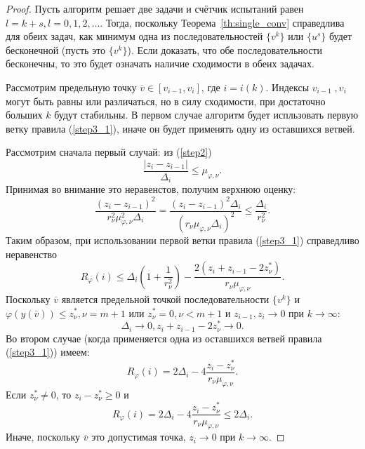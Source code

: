 \begin{proof}
  Пусть алгоритм решает две задачи и счётчик испытаний равен \(l = k + s, l=0,1,2,\dots\).
  Тогда, поскольку Теорема~\ref{th:single_conv} справедлива для обеих задач, как минимум одна из последовательностей
  \(\{v^k\}\) или \(\{u^s\}\) будет бесконечной (пусть это \(\{v^k\}\)).
  Если доказать, что обе последовательности бесконечны, то это будет означать наличие сходимости в обеих задачах.

  Рассмотрим предельную точку \(\overline{v}\in [v_{i-1},v_i]\), где \(i=i(k)\). Индексы \(v_{i-1}\;,v_i\)
  могут быть равны или различаться, но в силу сходимости, при достаточно больших \(k\) будут стабильны.
  В первом случае алгоритм будет испльзовать первую ветку правила (\ref{step3_1}), иначе он будет применять одну из оставшихся ветвей.

  Рассмотрим сначала первый случай: из (\ref{step2})
  \begin{displaymath}
    \frac{|z_i-z_{i-1}|}{\Delta_i} \leqslant \mu_{\varphi,\nu}.
  \end{displaymath}
  Принимая во внимание это неравенстов, получим верхнюю оценку:
  \begin{displaymath}
    \frac{(z_i-z_{i-1})^2}{r_\nu^2\mu_{\varphi,\nu}^2\Delta_i}=\frac{(z_i-z_{i-1})^2\Delta_i}{(r_\nu\mu_{\varphi,\nu}\Delta_i)^2}
    \leqslant \frac{\Delta_i}{r_\nu^2}.
  \end{displaymath}
  Таким образом, при использовании первой ветки правила (\ref{step3_1}) справедливо неравенство
  \begin{equation}
    \label{eq:th1}
    R_\varphi(i)\leqslant\Delta_i(1 + \frac{1}{r_\nu^2}) - \frac{2(z_i+z_{i-1}-2z^*_\nu)}{r_\nu\mu_{\varphi,\nu}}.
  \end{equation}
  Поскольку \(\overline{v}\) является предельной точкой последовательности \(\{v^k\}\) и \(\varphi(y(\overline{v}))\leqslant z^*_{\nu}, \nu=m+1\) или
  \(z^*_\nu=0, \nu<m+1\) и \(z_{i-1},z_i\to 0\) при \(k\to\infty\):
  \begin{equation}
    \label{eq:th2}
    \Delta_i\to 0, z_i+z_{i-1} - 2 z_\nu^*\to 0.
  \end{equation}
  Во втором случае (когда применяется одна из оставшихся ветвей правила (\ref{step3_1})) имеем:
  \begin{displaymath}
    R_\varphi(i)=2\Delta_i - 4\frac{z_i-z^*_\nu}{r_\nu\mu_{\varphi,\nu}}.
  \end{displaymath}
  Если \(z^*_\nu \ne 0\), то \(z_i-z^*_\nu \geqslant 0\) и
  \begin{equation}
    \label{eq:th3}
    R_\varphi(i)=2\Delta_i - 4\frac{z_i-z^*_\nu}{r_\nu\mu_{\varphi,\nu}} \leqslant 2\Delta_i.
  \end{equation}
  Иначе, поскольку \(\overline{v}\) это допустимая точка, \(z_i\to 0\) при \(k\to\infty\).


\end{proof}
